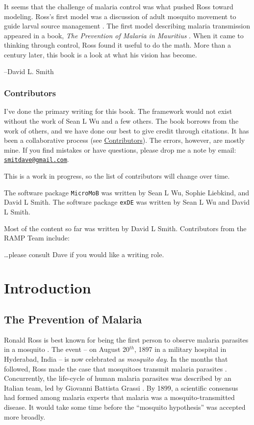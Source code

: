 \documentclass[
]{book}
\begin{document}
It seems that the challenge of malaria control was what pushed Ross toward modeling. Ross's first model was a discussion of adult mosquito movement to guide larval source management \autocite{RossR1905LogicalBasis}. The first model describing malaria transmission appeared in a book, \emph{The Prevention of Malaria in Mauritius} \autocite{RossR1908}. When it came to thinking through control, Ross found it useful to do the math. More than a century later, this book is a look at what his vision has become.

--David L. Smith

\section*{Contributors}\label{contributors}

I've done the primary writing for this book. The framework would not exist without the work of Sean L Wu and a few others. The book borrows from the work of others, and we have done our best to give credit through citations. It has been a collaborative process (see \hyperref[contributors]{Contributors}). The errors, however, are mostly mine. If you find mistakes or have questions, please drop me a note by email: \href{mailto:smitdave@gmail.com}{\nolinkurl{smitdave@gmail.com}}.

This is a work in progress, so the list of contributors will change over time.

The software package \texttt{MicroMoB} was written by Sean L Wu, Sophie Liebkind, and David L Smith. The software package \texttt{exDE} was written by Sean L Wu and David L Smith.

Most of the content so far was written by David L Smith. Contributors from the RAMP Team include:

\ldots please consult Dave if you would like a writing role.

\part{Introduction}\label{part-introduction}

\chapter{The Prevention of Malaria}\label{the-prevention-of-malaria}

Ronald Ross is best known for being the first person to observe malaria parasites in a mosquito \autocite{RossR1897PeculiarPigmented}. The event -- on August 20\(^{th}\), 1897 in a military hospital in Hyderabad, India -- is now celebrated as \emph{mosquito day}.
In the months that followed, Ross made the case that mosquitoes transmit malaria parasites \autocite{RossR1898RoleMosquito}.
Concurrently, the life-cycle of human malaria parasites was described by an Italian team, led by Giovanni Battista Grassi \autocite{GrassiB1898UlterioriRicerche,GrassiB1901StudiDi}.
By 1899, a scientific consensus had formed among malaria experts that malaria was a mosquito-transmitted disease.
It would take some time before the ``mosquito hypothesis'' was accepted more broadly.
\end{document}
